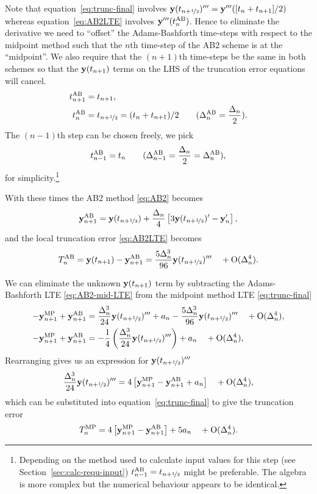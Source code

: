 Note that equation~\eqref{eq:trunc-final} involves $\mathbf{y}(t_{n+\nicefrac{1}{2}})''' = \mathbf{y}'''([t_n +t_{n+1}]/2)$ whereas equation~\eqref{eq:AB2LTE} involves $\mathbf{y}'''(t_n^{\text{AB}})$.
Hence to eliminate the derivative we need to ``offset'' the Adams-Bashforth time-steps with respect to the midpoint method such that the $n$th time-step of the AB2 scheme is at the ``midpoint''.
We also require that the $(n+1)$th time-steps be the same in both schemes so that the $\mathbf{y}(t_{n+1})$ terms on the LHS of the truncation error equations will cancel.
\begin{align}
  t_{n+1}^{\text{AB}} &= t_{n+1}, \notag\\
  t_n^{\text{AB}} &= t_{n+\nicefrac{1}{2}} = (t_{n} + t_{n+1})/2  \qquad   (\Delta_{n}^{\text{AB}} = \frac{\Delta_{n}}{2}).
  \label{eq:ab2-ts}
\end{align}
The $(n-1)$th step can be chosen freely, we pick
\begin{equation}
  t_{n-1}^{\text{AB}} = t_n  \qquad   (\Delta_{n-1}^{\text{AB}} = \frac{\Delta_{n}}{2} = \Delta_{n}^{\text{AB}}),
\end{equation}
for simplicity.\footnote{Depending on the method used to calculate input values for this step (see Section~\ref{sec:calc-requ-input}) $t_{n-1}^{\text{AB}} = t_{n+\nicefrac{1}{2}}$ might be preferable. The algebra is more complex but the numerical behaviour appears to be identical.}

With these times the AB2 method \eqref{eq:AB2} becomes
\begin{equation}
   \mathbf{y}_{n+1}^{\text{AB}} = \mathbf{y}(t_{n+\nicefrac{1}{2}}) + \frac{\Delta_{n}}{4} \left[
     3 \mathbf{y}(t_{n+\nicefrac{1}{2}})' - \mathbf{y}_n' \right],
   \label{eq:AB2-mid}
\end{equation}
and the local truncation error \eqref{eq:AB2LTE} becomes
\begin{equation}
  T_n^{\text{AB}} = \mathbf{y}(t_{n+1}) -  \mathbf{y}_{n+1}^{\text{AB}}
  = \frac{5 \Delta_{n}^3}{96} \mathbf{y}(t_{n+\nicefrac{1}{2}})''' \quad + \text{O}(\Delta_{n}^4).
\label{eq:AB2-mid-LTE}
\end{equation}

We can eliminate the unknown $\mathbf{y}(t_{n+1})$ term by subtracting the Adams-Bashforth LTE \eqref{eq:AB2-mid-LTE} from the midpoint method LTE \eqref{eq:trunc-final}
\begin{align}
 - \mathbf{y}_{n+1}^{\text{MP}} + \mathbf{y}_{n+1}^{\text{AB}} &=
   \frac{\Delta_{n}^3}{24} \mathbf{y}(t_{n+\nicefrac{1}{2}})''' + a_n
  - \frac{5\Delta_{n}^3}{96} \mathbf{y}(t_{n+\nicefrac{1}{2}})'''
  \quad + \text{O}(\Delta_{n}^4), \notag \\
  - \mathbf{y}_{n+1}^{\text{MP}} + \mathbf{y}_{n+1}^{\text{AB}} &= -\frac{1}{4} \left( \frac{\Delta_{n}^3}{24} \mathbf{y}(t_{n+\nicefrac{1}{2}})''' \right)
  + a_n
  \quad + \text{O}(\Delta_{n}^4),
\end{align}
Rearranging gives us an expression for $\mathbf{y}(t_{n+\nicefrac{1}{2}})'''$
\begin{equation}
  \frac{\Delta_{n}^3}{24} \mathbf{y}(t_{n+\nicefrac{1}{2}})''' = 4 \left[ \mathbf{y}_{n+1}^{\text{MP}} - \mathbf{y}_{n+1}^{\text{AB}} + a_n \right]  \quad + \text{O}(\Delta_{n}^4),
\end{equation}
which can be substituted into equation~\eqref{eq:trunc-final} to give the truncation error
\begin{equation}
  T_n^{\text{MP}} = 4 \left[ \mathbf{y}_{n+1}^{\text{MP}} - \mathbf{y}_{n+1}^{\text{AB}} \right] + 5 a_n
  \quad + \text{O}(\Delta_{n}^4).
  \label{eq:50}
\end{equation}


